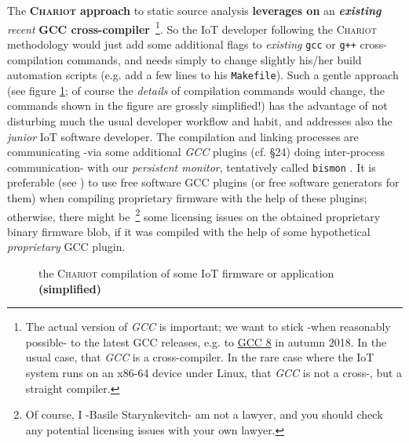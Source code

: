 The \textbf{\textsc{Chariot} approach} to static source analysis
\textbf{leverages on} an \textbf{\emph{existing}} \emph{recent}
\textbf{GCC cross-compiler}~\footnote{The actual version of \emph{GCC}
  is important; we want to stick -when reasonably possible- to the
  latest GCC releases, e.g. to \href{https://gcc.gnu.org/gcc-8/}{GCC
    8} in autumn 2018. In the usual case, that \emph{GCC} is a
  cross-compiler. In the rare case where the IoT system runs on an
  x86-64 device under Linux, that \emph{GCC} is not a cross-, but a
  straight compiler.}. So the IoT developer following the
\textsc{Chariot} methodology would just add some additional flags to
\emph{existing} \texttt{gcc} or \texttt{g++} cross-compilation
commands, and needs simply to change slightly his/her build automation
scripts (e.g. add a few lines to his \texttt{Makefile}). Such a gentle
approach (see figure \ref{fig:chariotcompil}; of course the \emph
{details} of compilation commands would change, the commands shown in
the figure are grossly simplified!) has the advantage of not
disturbing much the usual developer workflow and habit, and addresses
also the \emph{junior} IoT software developer. The compilation and
linking processes are communicating -via some additional \emph{GCC}
plugins (cf. \cite{gcc-internals} §24) doing inter-process
communication- with our 
 \emph{persistent monitor}, tentatively
called \texttt{bismon} . It is preferable (see
\cite{gcc-runtime-library-exception}) to use free software GCC plugins
(or free software generators for them) when compiling proprietary
firmware with the help of these plugins; otherwise, there might
be~\footnote{Of course, I -Basile Starynkevitch- am not a lawyer, and
  you should check any potential licensing issues with your own
  lawyer.} some licensing issues on the obtained proprietary binary
firmware blob, if it was compiled with the help of some hypothetical
\emph{proprietary} GCC plugin.

\begin{figure}[h]
  \begin{center}
  \end{center}
  \caption{the \textsc{Chariot} compilation of some IoT firmware or
    application {\textbf{(simplified)}}}
  \label{fig:chariotcompil}
\end{figure}


